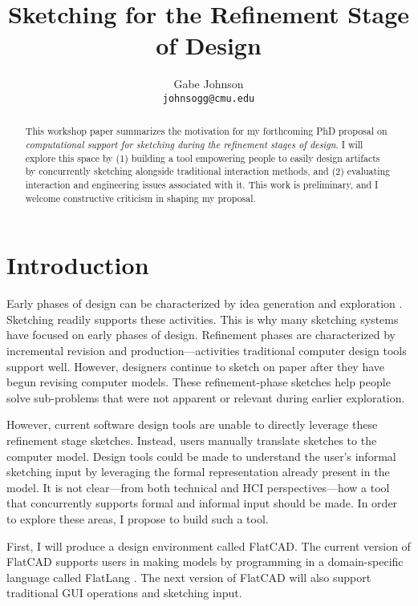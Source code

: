 \documentclass[times, 10pt, twocolumn]{article}
\title{Sketching for the Refinement Stage of Design}
\author{Gabe Johnson\\\texttt{johnsogg@cmu.edu}}
\begin{document}
\maketitle

\begin{abstract}
This workshop paper summarizes the motivation for my forthcoming PhD
proposal on \textit{computational support for sketching during the
  refinement stages of design}. I will explore this space by (1)
building a tool empowering people to easily design artifacts by
concurrently sketching alongside traditional interaction methods, and
(2) evaluating interaction and engineering issues associated with
it. This work is preliminary, and I welcome constructive criticism in
shaping my proposal.
\end{abstract}

\section{Introduction}

Early phases of design can be characterized by idea generation and
exploration \cite{newman-web-designers,buxton-sketching}. Sketching
readily supports these activities. This is why many sketching systems
have focused on early phases of design. Refinement phases are
characterized by incremental revision and production---activities
traditional computer design tools support well. However, designers
continue to sketch on paper after they have begun revising computer
models. These refinement-phase sketches help people solve sub-problems
that were not apparent or relevant during earlier exploration.

However, current software design tools are unable to directly leverage
these refinement stage sketches. Instead, users manually translate
sketches to the computer model. Design tools could be made to
understand the user's informal sketching input by leveraging the
formal representation already present in the model. It is not
clear---from both technical and HCI perspectives---how a tool that
concurrently supports formal and informal input should be made. In
order to explore these areas, I propose to build such a tool.

First, I will produce a design environment called FlatCAD. The current
version of FlatCAD supports users in making models by programming in a
domain-specific language called FlatLang \cite{johnson-flatcad}. The
next version of FlatCAD will also support traditional GUI operations
and sketching input. 
\end{document}
